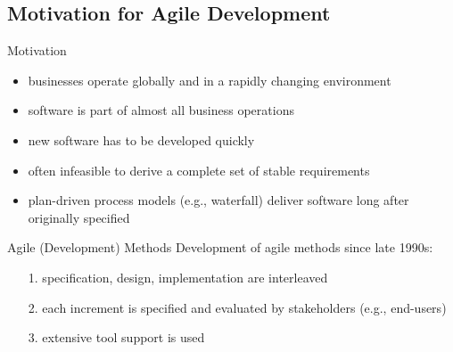\subsection{Motivation for Agile Development}
\begin{frame}{\insertsubsection}
	\begin{fancycolumns}
		\begin{note}{Motivation \mysource{\sommerville}}
			\begin{itemize}
				\item businesses operate globally and in a rapidly changing environment
				\item software is part of almost all business operations
				\item new software has to be developed quickly
				\item often infeasible to derive a complete set of stable requirements
				\item plan-driven process models (e.g., waterfall) deliver software long after originally specified
			\end{itemize}
		\end{note}
		\nextcolumn
		\begin{definition}{Agile (Development) Methods \mysource{\sommerville}}
			Development of agile methods since late 1990s:
			\begin{itemize}
				\item[1.] specification, design, implementation are interleaved
				\item[2.] each increment is specified and evaluated by stakeholders (e.g., end-users)
				\item[3.] extensive tool support is used
			\end{itemize}
		\end{definition}
	\end{fancycolumns}
\end{frame}


